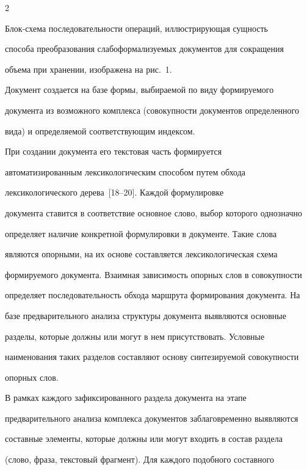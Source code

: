 \begin{multicols}{2}
     


     Блок-схема последовательности операций, иллюстрирующая сущность 


способа преобразования слабоформализуемых документов для сокращения 


объема при хранении, изображена на рис.~1.


     


     Документ создается на базе формы, вы\-би\-ра\-емой по виду формируемого 


документа из возможного комплекса (совокупности документов определенного 


вида) и определяемой соответствующим индексом.








     При создании документа его текстовая часть формируется 


автоматизированным лексикологическим способом путем обхода 


лексикологического дерева~[18--20]. Каждой формулировке 


документа ставится в соответствие основное слово, выбор которого однозначно 


определяет наличие конкретной формулировки в документе. Такие слова 


являются опорными, на их основе составляется лексикологическая схема 


формируемого документа. Взаимная зависимость опорных слов в совокупности 


определяет последовательность обхода маршрута формирования документа. На 


базе предварительного анализа структуры документа выявляются основные 


разделы, которые должны или могут в нем присутствовать. Условные 


наименования таких разделов составляют основу синтезируемой совокупности 


опорных слов.


     


     В рамках каждого зафиксированного раздела документа на этапе 


предварительного анализа комплекса документов заблаговременно выявляются 


составные элементы, которые должны или могут входить в состав раздела 


(слово, фраза, текстовый фрагмент). Для каждого подобного составного 



\end{multicols}

